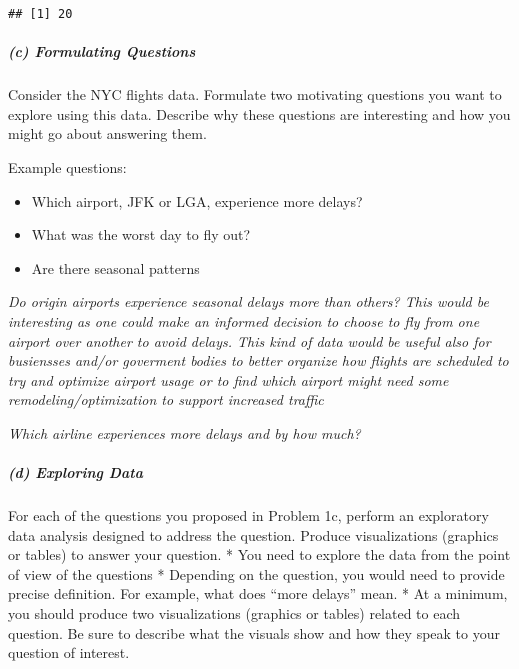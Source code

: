 \documentclass[
]{article}
\newenvironment{Shaded}{\begin{snugshade}}{\end{snugshade}}
\newcommand{\CommentTok}[1]{\textcolor[rgb]{0.56,0.35,0.01}{\textit{#1}}}
\newcommand{\DataTypeTok}[1]{\textcolor[rgb]{0.13,0.29,0.53}{#1}}
\newcommand{\KeywordTok}[1]{\textcolor[rgb]{0.13,0.29,0.53}{\textbf{#1}}}
\newcommand{\NormalTok}[1]{#1}
\newcommand{\OperatorTok}[1]{\textcolor[rgb]{0.81,0.36,0.00}{\textbf{#1}}}
\newcommand{\OtherTok}[1]{\textcolor[rgb]{0.56,0.35,0.01}{#1}}
\newcommand{\StringTok}[1]{\textcolor[rgb]{0.31,0.60,0.02}{#1}}
\providecommand{\tightlist}{%
  \setlength{\itemsep}{0pt}\setlength{\parskip}{0pt}}
\begin{document}
\begin{verbatim}
## [1] 20
\end{verbatim}

\hypertarget{c-formulating-questions}{%
\subparagraph{(c) Formulating Questions}\label{c-formulating-questions}}

Consider the NYC flights data. Formulate two motivating questions you
want to explore using this data. Describe why these questions are
interesting and how you might go about answering them.

Example questions:

\begin{itemize}
\tightlist
\item
  Which airport, JFK or LGA, experience more delays?
\item
  What was the worst day to fly out?
\item
  Are there seasonal patterns
\end{itemize}

\emph{Do origin airports experience seasonal delays more than others?
This would be interesting as one could make an informed decision to
choose to fly from one airport over another to avoid delays. This kind
of data would be useful also for busiensses and/or goverment bodies to
better organize how flights are scheduled to try and optimize airport
usage or to find which airport might need some remodeling/optimization
to support increased traffic}

\emph{Which airline experiences more delays and by how much?}

\hypertarget{d-exploring-data}{%
\subparagraph{(d) Exploring Data}\label{d-exploring-data}}

For each of the questions you proposed in Problem 1c, perform an
exploratory data analysis designed to address the question. Produce
visualizations (graphics or tables) to answer your question. * You need
to explore the data from the point of view of the questions * Depending
on the question, you would need to provide precise definition. For
example, what does ``more delays'' mean. * At a minimum, you should
produce two visualizations (graphics or tables) related to each
question. Be sure to describe what the visuals show and how they speak
to your question of interest.

\begin{Shaded}
\end{Shaded}
\end{document}
